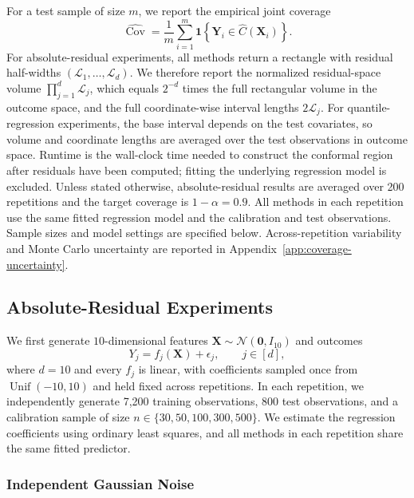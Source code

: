 For a test sample of size $m$, we report the empirical joint coverage
\[
  \widehat{\operatorname{Cov}}
  = \frac{1}{m}\sum_{i=1}^{m}
    \mathbf{1}\!\left\{\boldsymbol{Y}_i
    \in \widehat{C}(\boldsymbol{X}_i)\right\}.
\]
For absolute-residual experiments, all methods return a rectangle with residual
half-widths $(\mathcal{L}_1,\ldots,\mathcal{L}_d)$. We therefore report the normalized
residual-space volume $\prod_{j=1}^{d}\mathcal{L}_j$, which equals $2^{-d}$ times the
full rectangular volume in the outcome space, and the full coordinate-wise interval lengths
$2\mathcal{L}_j$. For quantile-regression experiments, the base interval
depends on the test covariates, so volume and coordinate lengths are
averaged over the test observations in outcome space. Runtime is
the wall-clock time needed to construct the conformal region after residuals
have been computed; fitting the underlying regression model is excluded. Unless
stated otherwise, absolute-residual results are averaged over 200 repetitions
and the target coverage is $1-\alpha=0.9$. All methods in each repetition use
the same fitted regression model and the calibration and test observations.
Sample sizes and model settings are specified below. Across-repetition variability and
Monte Carlo uncertainty are reported in Appendix~\ref{app:coverage-uncertainty}.

\subsection{Absolute-Residual Experiments}
\label{sec:absolute-residual-experiments}

We first generate $10$-dimensional features
$\boldsymbol{X}\sim\mathcal{N}(\boldsymbol{0},I_{10})$ and outcomes
\begin{equation}
  Y_j=f_j(\boldsymbol X)+\epsilon_j,\qquad j\in[d],
  \label{eq:data-generator}
\end{equation}
where $d=10$ and every $f_j$ is linear, with coefficients sampled once
from $\operatorname{Unif}(-10,10)$ and held fixed across repetitions.
In each repetition, we independently generate 7,200 training observations,
800 test observations, and a calibration sample of size $n\in\{30,50,100,300,500\}$. We
estimate the regression coefficients using
ordinary least squares, and all methods in each repetition share the same fitted predictor. 

\subsubsection{Independent Gaussian Noise}

